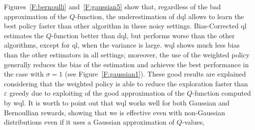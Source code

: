Figures~\ref{F:bernoulli} and~\ref{F:gaussian5} show that, regardless of the bad approximation of the $Q$-function, the underestimation of \gls{dql} allows to learn the best policy faster than other algorithm in these noisy settings.
Bias-Corrected \gls{ql} estimates the $Q$-function better than \gls{dql}, but performs worse than the other algorithms, except for \gls{ql}, when the variance is large.
\gls{wql} shows much less bias than the other estimators in all settings; moreover, the use of the weighted policy generally reduces the bias of the estimation and achieves the best performance in the case with $\sigma = 1$ (see Figure~\ref{F:gaussian1}). These good results are explained considering that the weighted policy is able to reduce the exploration faster than $\varepsilon$ greedy due to exploiting of the good approximation of the $Q$-function computed by \gls{wql}. It is worth to point out that \gls{wql} works well for both Gaussian and Bernoullian rewards, showing that \gls{we} is effective even with non-Gaussian distributions even if it uses a Gaussian approximation of $Q$-values,


